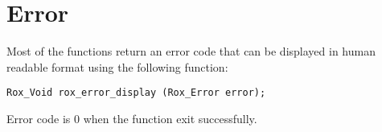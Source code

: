 \section{Error}
\label{sec:error}
Most of the \rox{} functions return an error code that can be displayed in human readable format using the following function:

\begin{lstlisting}
Rox_Void rox_error_display (Rox_Error error);
\end{lstlisting}

Error code is 0 when the function exit successfully.

